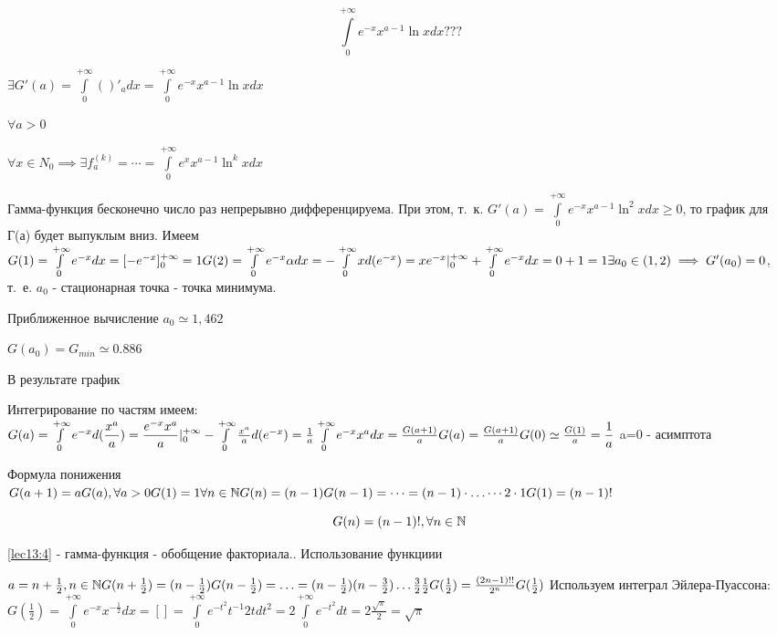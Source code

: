 \documentclass[../../main.tex]{subfiles}
\begin{document}
\[
\int\limits_0^{+\infty} e^{-x} x^{a-1} \ln x dx ???
\]

$
\exists G'(a) = \int\limits_0^{+\infty} ()'_a dx = \int\limits_0^{+\infty} e^{-x} x^{a-1} \ln x dx 
$

$\forall a > 0$

$
\forall x \in N_0 \implies \exists f^{(k)}_a = \cdots = 
\int\limits_0^{+\infty} e^x x^{a-1} \ln^k x dx 
$

Гамма-функция бесконечно число раз непрерывно дифференцируема.
При этом, т.~к. $G'(a) = \int\limits_0^{+\infty} e^{-x} x^{a-1} \ln^2 x dx \ge 0$,
то график для Г(а) будет выпуклым вниз. Имеем
$
G(1) = \int\limits_0^{+\infty} e^{-x} dx = [-e^{-x}]^{+\infty}_0 = 1
\\
G(2) = \int\limits_0^{+\infty} e^{-x} \alpha dx = 
- \int\limits_0^{+\infty} x d(e^{-x}) = 
xe^{-x}|^{+\infty}_0 + \int\limits_0^{+\infty} e^{-x} dx = 
0 + 1 = 1
\\
\exists a_0 \in (1, 2) \implies G'(a_0) = 0$, т.~е. $a_0$ - стационарная точка - точка минимума.

Приближенное вычисление $a_0 \simeq 1,462$

$G(a_0) = G_{min} \simeq 0.886$

В результате график

Интегрирование по частям имеем:
$
G(a) = \int\limits_0^{+\infty} e^{-x} d(\dfrac{x^a}{a}) =
 \dfrac{e^{-x}x^a}{a} |^{+\infty}_0 - \int\limits_0^{+\infty} \frac{x^a}{a} d(e^{-x}) = 
 \frac{1}{a} \int\limits_0^{+\infty} e^{-x} x^a dx = \frac{G(a+1)}{a}
\\
G(a) = \frac{G(a+1)}{a}
\\
G(0) \simeq \frac{G(1)}{a} = \dfrac{1}{a}
$
a=0 - асимптота

Формула понижения
\\
$
G(a+1) = aG(a), \forall a > 0
\\
G(1) = 1
\\
\forall n \in \mathbb{N}
\\
G(n) = (n-1)G(n-1) = \cdots = (n-1) \cdot \ldots \cdots 2 \cdot 1 G(1) = (n-1)!
$

\begin{equation}
\label{lec13:4}
G(n) = (n-1)!,  \forall n \in \mathbb{N}
\end{equation}

\eqref{lec13:4} - гамма-функция - обобщение факториала.. Использование функциии

$
a = n + \frac{1}{2}, n \in \mathbb{N}
\\
G(n + \frac{1}{2}) = (n - \frac{1}{2})G(n-\frac{1}{2})=\ldots=
(n-\frac{1}{2})(n-\frac{3}{2})\ldots\frac{3}{2}\frac{1}{2}G(\frac{1}{2}) = 
\frac{(2n-1)!!}{2^n}G(\frac{1}{2})
$
Используем интеграл Эйлера-Пуассона:
\\
$
G(\frac{1}{2})= \int\limits_0^{+\infty} e^{-x} x^{-\frac{1}{2}} dx = [] = 
\int\limits_0^{+\infty} e^{-t^2} t^{-1} 2t dt^2 = 2 \int\limits_0^{+\infty} e^{-t^2} dt 
= 2 \frac{\sqrt{\pi}}{2} = \sqrt{\pi}
$
\end{document}

